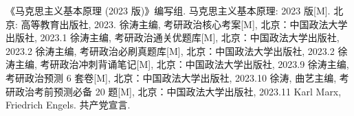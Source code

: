 \documentclass[10pt, UTF8]{book} %
\begin{document}
\newpage
\thispagestyle{empty}
\begin{thebibliography}{1}
    《马克思主义基本原理 (2023 版)》编写组. 马克思主义基本原理: 2023 版[M].
    北京: 高等教育出版社, 2023.
    徐涛主编, 考研政治核心考案[M], 北京：中国政法大学出版社, 2023.1
    徐涛主编, 考研政治通关优题库[M], 北京：中国政法大学出版社, 2023.2
    徐涛主编, 考研政治必刷真题库[M], 北京：中国政法大学出版社, 2023.2
    徐涛主编, 考研政治冲刺背诵笔记[M], 北京：中国政法大学出版社, 2023.9
    徐涛主编, 考研政治预测 6 套卷[M], 北京：中国政法大学出版社, 2023.10
    徐涛, 曲艺主编, 考研政治考前预测必备 20 题[M], 北京：中国政法大学出版社, 2023.11
    Karl Marx, Friedrich Engels. 共产党宣言.
\end{thebibliography}


\end{document}
